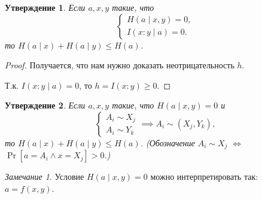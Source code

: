 \documentclass[12pt]{article}
\theoremstyle{definition}
\theoremstyle{plain}
\newtheorem{statement}{Утверждение}[section]
\theoremstyle{remark}
\newtheorem{remark}{Замечание}[section]
\begin{document}
\begin{statement}
    Если $a,x,y$ такие, что
\[
    \begin{cases}
        H(a\mid x,y) = 0,\\
        I(x:y\mid a) = 0.
    \end{cases}
\]
то  \(H(a\mid x) + H(a\mid y) \le H(a)\).
\end{statement}
\begin{proof}
    Получается, что нам нужно доказать неотрицательность $h$. 
    \begin{center}
    \end{center}
Т.к. $I(x:y\mid a) = 0$, то $h = I(x:y)\ge 0$.
\end{proof}
\begin{statement}\label{st:entropy:triple-rect}
    Если $a,x,y$ такие, что $H(a\mid x,y) = 0$ и
\[
    \begin{cases}
        A_i \sim X_j\\
        A_i \sim Y_k
    \end{cases} \implies A_i\sim(X_j,Y_k),
\]
то  \(H(a\mid x) + H(a\mid y) \le H(a)\). (Обозначение $A_i\sim X_j$ $\iff$ $\Pr[a=A_i \land x=X_j]>0$.)
\end{statement}
\begin{remark}
    Условие $H(a\mid x,y) = 0$ можно интерпретировать так: $a = f(x,y)$.
\end{remark}
\end{document}
